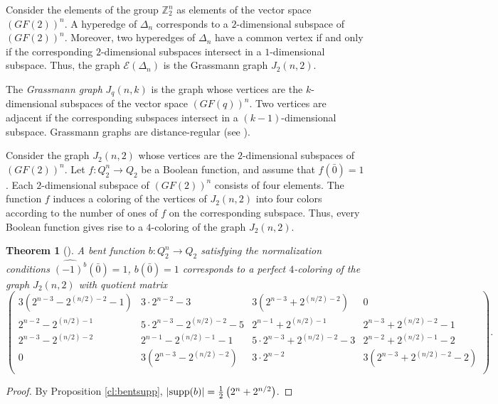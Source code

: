 \documentclass[11pt]{article}
\newtheorem{theorem}{Theorem}[section]
\theoremstyle{definition}
\newcommand{\supp}{{\rm supp}}
\begin{document}
{{{Consider the elements of the group $\mathbb{Z}_2^n$ as elements of the vector space $(GF(2))^n$. A hyperedge of $\Delta_n$ corresponds to a $2$-dimensional subspace of $(GF(2))^n$. Moreover, two hyperedges of $\Delta_n$ have a common vertex if and only if the corresponding $2$-dimensional subspaces intersect in a $1$-dimensional subspace. Thus, the graph $\mathcal{E}(\Delta_n)$ is the Grassmann graph $J_2(n,2)$.

The {\sl Grassmann graph} $J_q(n,k)$ is the graph whose vertices are the $k$-dimensional subspaces of the vector space $(GF(q))^n$. Two vertices are adjacent if the corresponding subspaces intersect in a $(k-1)$-dimensional subspace. Grassmann graphs are distance-regular (see \cite{BCN}).

Consider the graph $J_2(n,2)$ whose vertices are the $2$-dimensional subspaces of $(GF(2))^n$. Let
$f:Q_2^n\to Q_2$
be a Boolean function, and assume that $f(\bar 0)=1$. Each $2$-dimensional subspace of $(GF(2))^n$ consists of four elements. The function $f$ induces a coloring of the vertices of $J_2(n,2)$ into four colors according to the number of ones of $f$ on the corresponding subspace. Thus, every Boolean function gives rise to a $4$-coloring of the graph $J_2(n,2)$.

\begin{theorem}[\cite{PA20}]\label{avg}
A bent function $b:Q_2^n\to Q_2$ satisfying the normalization conditions $\widehat{(-1)^b}(\bar 0)=1$, %
$b(\bar 0)=1$
corresponds to a perfect $4$-coloring of the graph $J_2(n,2)$ with quotient matrix
{\tiny
\[
\begin{pmatrix}
3(2^{n-3}-2^{(n/2)-2}-1)& 3\cdot2^{n-2}-3 & 3(2^{n-3}+2^{(n/2)-2}) & 0\\
2^{n-2}-2^{(n/2)-1} & 5\cdot2^{n-3}-2^{(n/2)-2}-5& 2^{n-1}+2^{(n/2)-1} & 2^{n-3}+2^{(n/2)-2}-1\\
2^{n-3}-2^{(n/2)-2} & 2^{n-1}-2^{(n/2)-1}-1 & 5\cdot2^{n-3}+2^{(n/2)-2}-3 & 2^{n-2}+2^{(n/2)-1}-2 \\
0 & 3(2^{n-3}-2^{(n/2)-2}) & 3\cdot2^{n-2} & 3(2^{n-3}+2^{(n/2)-2}-2)\\
\end{pmatrix}.
\]
}
\end{theorem}

\begin{proof}
By Proposition \ref{cl:bentsupp},
$
|\supp(b)|
=\frac12\left(2^n+2^{n/2}\right)$.



\end{proof}}}}
\end{document}
